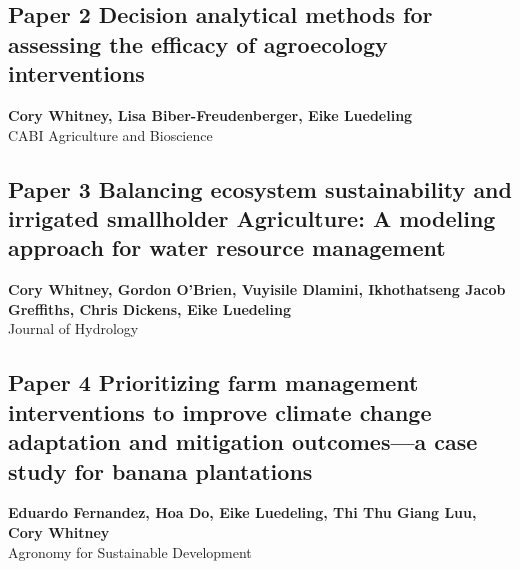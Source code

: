 \documentclass[
]{article}
\begin{document}
\newpage

\hypertarget{whitney_decision_2023}{%
\subsection{Paper 2 Decision analytical methods for assessing the
efficacy of agroecology interventions}\label{whitney_decision_2023}}

\begin{center}
\vspace*{2cm}
{\Large \textbf{Cory Whitney, Lisa Biber-Freudenberger, Eike Luedeling}} \\[0.5cm]
\vspace*{1cm}
{\Large CABI Agriculture and Bioscience} \\[2cm]
\end{center}


\newpage

\hypertarget{whitney_balancing_2025}{%
\subsection{Paper 3 Balancing ecosystem sustainability and irrigated
smallholder Agriculture: A modeling approach for water resource
management}\label{whitney_balancing_2025}}

\begin{center}
\vspace*{2cm}
{\Large \textbf{Cory Whitney, Gordon O’Brien, Vuyisile Dlamini, Ikhothatseng Jacob Greffiths, Chris Dickens, Eike Luedeling}} \\[0.5cm]
\vspace*{1cm}
{\Large Journal of Hydrology} \\[2cm]
\end{center}


\newpage

\hypertarget{fernandez_prioritizing_2022}{%
\subsection{Paper 4 Prioritizing farm management interventions to
improve climate change adaptation and mitigation outcomes---a case study
for banana plantations}\label{fernandez_prioritizing_2022}}

\begin{center}
\vspace*{2cm}
{\Large \textbf{Eduardo Fernandez, Hoa Do, Eike Luedeling, Thi Thu Giang Luu, Cory Whitney}} \\[0.5cm]
\vspace*{1cm}
{\Large Agronomy for Sustainable Development} \\[2cm]
\end{center}

\end{document}

